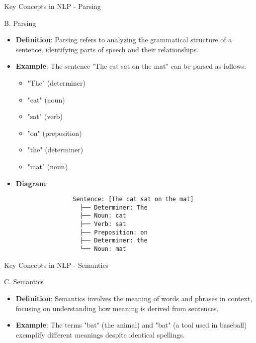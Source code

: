 \documentclass[aspectratio=169]{beamer}
\begin{document}
\begin{frame}[fragile]{Key Concepts in NLP - Parsing}
    \begin{block}{B. Parsing}
        \begin{itemize}
            \item \textbf{Definition}: Parsing refers to analyzing the grammatical structure of a sentence, identifying parts of speech and their relationships.
            \item \textbf{Example}: The sentence "The cat sat on the mat" can be parsed as follows:
            \begin{itemize}
                \item "The" (determiner) 
                \item "cat" (noun)
                \item "sat" (verb)
                \item "on" (preposition)
                \item "the" (determiner)
                \item "mat" (noun)
            \end{itemize}
            \item \textbf{Diagram}:
            \begin{verbatim}
                Sentence: [The cat sat on the mat]
                  ├── Determiner: The
                  ├── Noun: cat
                  ├── Verb: sat
                  ├── Preposition: on
                  ├── Determiner: the
                  └── Noun: mat
            \end{verbatim}
        \end{itemize}
    \end{block}
\end{frame}

\begin{frame}[fragile]{Key Concepts in NLP - Semantics}
    \begin{block}{C. Semantics}
        \begin{itemize}
            \item \textbf{Definition}: Semantics involves the meaning of words and phrases in context, focusing on understanding how meaning is derived from sentences.
            \item \textbf{Example}: The terms "bat" (the animal) and "bat" (a tool used in baseball) exemplify different meanings despite identical spellings.
        \end{itemize}
    \end{block}
\end{frame}
\end{document}
